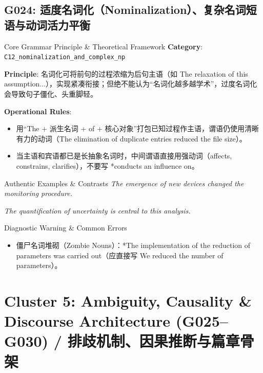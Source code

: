 \subsection{G024: 适度名词化（Nominalization）、复杂名词短语与动词活力平衡}\label{sec:rule:G024}
\begin{ConceptBox}{Core Grammar Principle \& Theoretical Framework}
\textbf{Category}: \texttt{C12\_nominalization\_and\_complex\_np}\par\vspace{3pt}
\textbf{Principle}: 名词化可将前句的过程浓缩为后句主语（如 The relaxation of this assumption...），实现紧凑衔接；但绝不能认为“名词化越多越学术”，过度名词化会导致句子僵化、头重脚轻。\par\vspace{4pt}
\textbf{Operational Rules}:
\begin{itemize}[leftmargin=1.5em, itemsep=1pt]
  \item 用“The + 派生名词 + of + 核心对象”打包已知过程作主语，谓语仍使用清晰有力的动词（The elimination of duplicate entries reduced the file size）。
  \item 当主语和宾语都已是长抽象名词时，中间谓语直接用强动词（affects, constrains, clarifies），不要写 *conducts an influence on。
\end{itemize}
\end{ConceptBox}
\begin{ExampleBox}{Authentic Examples \& Contrasts}
\textit{The emergence of new devices changed the monitoring procedure.}\par\vspace{2pt}
\textit{The quantification of uncertainty is central to this analysis.}\par\vspace{2pt}
\end{ExampleBox}
\begin{TipBox}{Diagnostic Warning \& Common Errors}
\begin{itemize}[leftmargin=1.5em, itemsep=1pt]
  \item 僵尸名词堆砌（Zombie Nouns）：*The implementation of the reduction of parameters was carried out（应直接写 We reduced the number of parameters）。
\end{itemize}
\end{TipBox}
\vspace{6pt}
\section{Cluster 5: Ambiguity, Causality \& Discourse Architecture (G025--G030) / 排歧机制、因果推断与篇章骨架}
